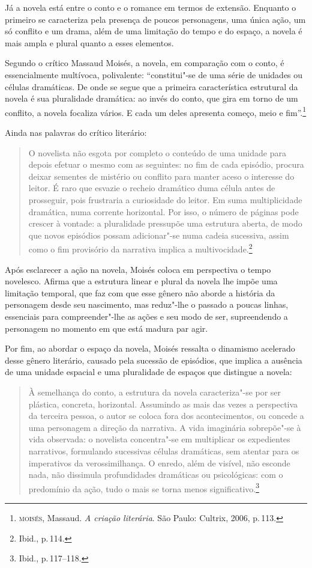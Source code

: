 Já a novela está entre o conto e o
romance em termos de extensão. Enquanto o primeiro se caracteriza pela
presença de poucos personagens, uma única ação, um só conflito e um
drama, além de uma limitação do tempo e do espaço, a novela é mais ampla
e plural quanto a esses elementos.

Segundo o crítico Massaud Moisés, a novela, em comparação com o conto, é essencialmente multívoca, polivalente: ``constitui"-se de uma série de unidades ou células dramáticas. De onde se segue que a primeira característica estrutural da novela é sua pluralidade dramática: ao invés do conto, que gira em torno de um conflito, a novela focaliza vários. E cada um deles apresenta começo, meio e fim''.\footnote{\textsc{moisés}, Massaud. \textit{A criação literária}. São Paulo: Cultrix, 2006, p.\,113.}

Ainda nas palavras do crítico literário:

\begin{quote}
O novelista não esgota por completo o conteúdo de uma unidade para depois efetuar o mesmo com as seguintes: no fim de cada episódio, procura deixar sementes de mistério ou conflito para manter aceso o interesse do leitor. É raro que esvazie o recheio dramático duma célula antes de prosseguir, pois frustraria a curiosidade do leitor.
Em suma multiplicidade dramática, numa corrente horizontal. Por isso, o número de páginas pode crescer à vontade: a pluralidade pressupõe uma estrutura aberta, de modo que novos episódios possam adicionar"-se numa cadeia sucessiva, assim como o fim provisório da narrativa implica a multivocidade.\footnote{Ibid., p.\,114.}
\end{quote}

Após esclarecer a ação na novela, Moisés coloca em perspectiva o tempo novelesco. Afirma que a estrutura linear e plural da novela lhe impõe uma limitação temporal, que faz com que esse gênero não aborde a história da personagem desde seu nascimento, mas reduz"-lhe o passado a poucas linhas, essenciais para compreender"-lhe as ações e seu modo de ser, supreendendo a personagem no momento em que está madura par agir.

Por fim, ao abordar o espaço da novela, Moisés ressalta o dinamismo acelerado desse gênero literário, causado pela sucessão de episódios, que implica a ausência de uma unidade espacial e uma pluralidade de espaços que distingue a novela:

\begin{quote}
À semelhança do conto, a estrutura da novela caracteriza"-se por ser plástica, concreta, horizontal. Assumindo as mais das vezes a perspectiva da terceira pessoa, o autor se coloca fora dos acontecimentos, ou concede a uma personagem a direção da narrativa. A vida imaginária sobrepõe"-se à vida observada: o novelista concentra"-se em multiplicar os expedientes narrativos, formulando sucessivas células dramáticas, sem atentar para os imperativos da verossimilhança. O enredo, além de visível, não esconde nada, não dissimula profundidades dramáticas ou psicológicas: com o predomínio da ação, tudo o mais se torna menos significativo.\footnote{Ibid., p.\,117--118.}
\end{quote}

